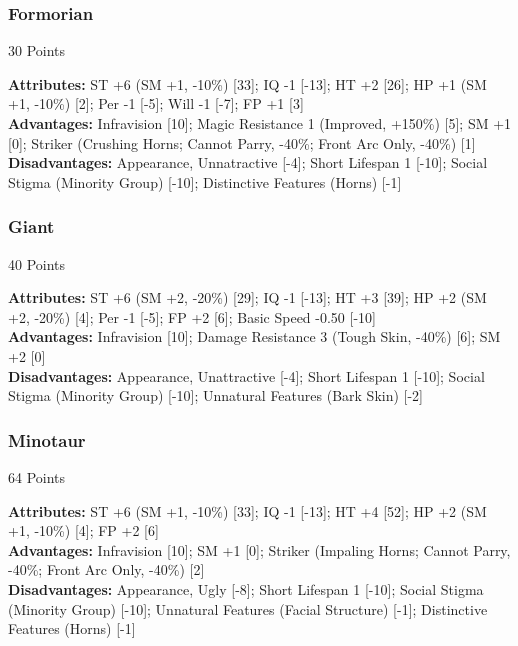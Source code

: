 \begin{multicols*}{3}
	\subsubsection*{Formorian}
	\begin{flushright}
		30 Points
	\end{flushright}
	\textbf{Attributes:} 
	ST +6 (SM +1, -10\%) [33]; IQ -1 [-13]; HT +2 [26]; HP +1 (SM +1, -10\%) [2]; Per -1 [-5]; Will -1 [-7]; FP +1 [3]
	\\\textbf{Advantages:} 
	Infravision [10]; Magic Resistance 1 (Improved, +150\%) [5]; SM +1 [0]; Striker (Crushing Horns; Cannot Parry, -40\%; Front Arc Only, -40\%) [1]
	\\\textbf{Disadvantages:} 
	Appearance, Unnatractive [-4]; Short Lifespan 1 [-10]; Social Stigma (Minority Group) [-10]; Distinctive Features (Horns) [-1]
	
	\subsubsection*{Giant}
	\begin{flushright}
		40 Points
	\end{flushright}
	\textbf{Attributes:} 
	ST +6 (SM +2, -20\%) [29]; IQ -1 [-13]; HT +3 [39]; HP +2 (SM +2, -20\%) [4]; Per -1 [-5]; FP +2 [6]; Basic Speed -0.50 [-10]
	\\\textbf{Advantages:} 
	Infravision [10]; Damage Resistance 3 (Tough Skin, -40\%) [6]; SM +2 [0]
	\\\textbf{Disadvantages:} 
	Appearance, Unattractive [-4]; Short Lifespan 1 [-10]; Social Stigma (Minority Group) [-10]; Unnatural Features (Bark Skin) [-2]
	
	\subsubsection*{Minotaur}
	\begin{flushright}
		64 Points
	\end{flushright}
	\textbf{Attributes:} 
	ST +6 (SM +1, -10\%) [33]; IQ -1 [-13]; HT +4 [52]; HP +2 (SM +1, -10\%) [4]; FP +2 [6]
	\\\textbf{Advantages:} 
	Infravision [10]; SM +1 [0]; Striker (Impaling Horns; Cannot Parry, -40\%; Front Arc Only, -40\%) [2]
	\\\textbf{Disadvantages:} 
	Appearance, Ugly [-8]; Short Lifespan 1 [-10]; Social Stigma (Minority Group) [-10]; Unnatural Features (Facial Structure) [-1]; Distinctive Features (Horns) [-1]
	

\end{multicols*}
